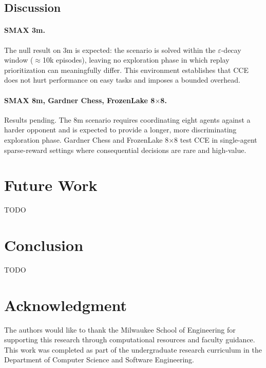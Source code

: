 \documentclass[conference]{IEEEtran}
\begin{document}
\subsection{Discussion}

\paragraph{SMAX 3m.}
The null result on 3m is expected: the scenario is solved within the $\varepsilon$-decay window ($\approx$10k episodes), leaving no exploration phase in which replay prioritization can meaningfully differ.
This environment establishes that CCE does not hurt performance on easy tasks and imposes a bounded overhead.

\paragraph{SMAX 8m, Gardner Chess, FrozenLake 8$\times$8.}
Results pending.
The 8m scenario requires coordinating eight agents against a harder opponent and is expected to provide a longer, more discriminating exploration phase.
Gardner Chess and FrozenLake 8$\times$8 test CCE in single-agent sparse-reward settings where consequential decisions are rare and high-value.

\section{Future Work}
\noindent TODO

\section{Conclusion}
\noindent TODO

\section*{Acknowledgment}
The authors would like to thank the Milwaukee School of Engineering for supporting this research through computational resources and faculty guidance. This work was completed as part of the undergraduate research curriculum in the Department of Computer Science and Software Engineering.

\newpage
\printbibliography
\end{document}
